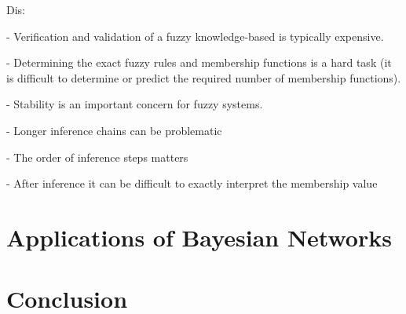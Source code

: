 \documentclass[11pt]{article}
\begin{document}
Dis:

- Verification and validation of a fuzzy knowledge-based is typically expensive.

- Determining the exact fuzzy rules and membership functions is a hard task
(it is difficult to determine or predict the required number of membership
functions).

- Stability is an important concern for fuzzy systems.

- Longer inference chains can be problematic 

- The order of inference steps matters

- After inference it can be difficult to exactly interpret the membership value 


\section{Applications of Bayesian Networks}

\section{Conclusion}



\end{document}
